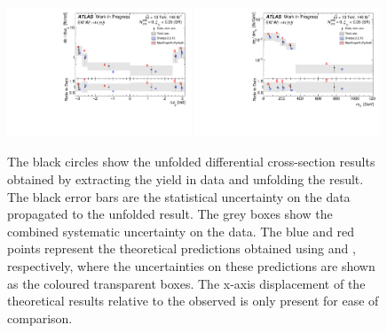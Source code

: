 \begin{figure}[t]
  \includegraphics[width=0.49\textwidth]{plots/diffx/diffxsections/Dphi_jj_WIP_12Feb.pdf}
  \includegraphics[width=0.49\textwidth]{plots/diffx/diffxsections/m_lgamma_WIP_12Feb.pdf}
  \caption{The black circles show the unfolded differential cross-section results obtained by extracting the \ewwy yield in data and unfolding the result. The black error bars are the statistical uncertainty on the data propagated to the unfolded result. The grey boxes show the combined systematic uncertainty on the data. The blue and red points represent the theoretical \ewwy predictions obtained using \SHERPA and \MADGRAPH, respectively, where the uncertainties on these predictions are shown as the coloured transparent boxes. The x-axis displacement of the theoretical results relative to the observed is only present for ease of comparison.\label{fig:vbswy:diffx}}
\end{figure}

